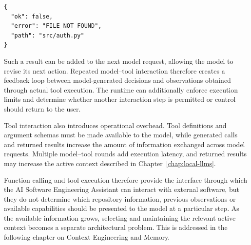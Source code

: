 \noindent\begin{minipage}{\linewidth}
\small\singlespacing
\begin{verbatim}
{
  "ok": false,
  "error": "FILE_NOT_FOUND",
  "path": "src/auth.py"
}
\end{verbatim}
\end{minipage}

Such a result can be added to the next model request, allowing the model to revise its next action. Repeated model–tool interaction therefore creates a feedback loop between model-generated decisions and observations obtained through actual tool execution. The runtime can additionally enforce execution limits and determine whether another interaction step is permitted or control should return to the user.

\begingroup
\setlength{\emergencystretch}{2em}
Tool interaction also introduces operational overhead. Tool definitions and argument schemas must be made available to the model, while generated calls and returned results increase the amount of information exchanged across model requests. Multiple model–tool rounds add execution latency, and returned results may increase the active context described in Chapter~\ref{chap:local-llms}.
\par\endgroup

Function calling and tool execution therefore provide the interface through which the AI Software Engineering Assistant can interact with external software, but they do not determine which repository information, previous observations or available capabilities should be presented to the model at a particular step. As the available information grows, selecting and maintaining the relevant active context becomes a separate architectural problem. This is addressed in the following chapter on Context Engineering and Memory.
